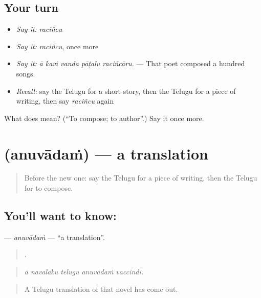 \subsection*{Your turn}
\begin{itemize}
\raggedright
  \item \emph{Say it:} \emph{raciñcu}
  \item \emph{Say it:} \emph{raciñcu}, once more
  \item \emph{Say it:} \emph{ā kavi vanda pāṭalu raciñcāru.} — That poet composed a hundred songs.
  \item \emph{Recall:} say the Telugu for a short story, then the Telugu for a piece of writing, then say \emph{raciñcu} again
\end{itemize}

\begin{tcolorbox}[breakable,colback=teal!4,colframe=teal!35!black,title={Before you move on}]
What does  mean? (\textquotedblleft{}To compose; to author\textquotedblright{}.) Say it once more.
\end{tcolorbox}
\section[\texorpdfstring{\te{అనువాదం} (anuvādaṁ)}{అనువాదం (anuvādaṁ)}]{ (anuvādaṁ) — a translation}

\label{lesson:TE-C540-anuvadam}



\begin{quote}
Before the new one: say the Telugu for a piece of writing, then the Telugu for to compose.
\end{quote}

\subsection*{You'll want to know: }
\textbf{} — \emph{anuvādaṁ} — \textquotedblleft{}a translation\textquotedblright{}.

\begin{quote}
    .
\end{quote}

\begin{quote}
\emph{ā navalaku telugu anuvādaṁ vaccindi.}
\end{quote}

\begin{quote}
A Telugu translation of that novel has come out.
\end{quote}


